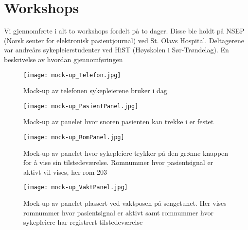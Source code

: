\section{Workshops}
\label{workshops}

Vi gjennomførte i alt to workshops fordelt på to dager. Disse ble holdt på NSEP (Norsk senter for elektronisk pasientjournal) ved St. Olavs Hospital. Deltagerene var andreårs sykepleierstudenter ved HiST (Høyskolen i Sør-Trøndelag). En beskrivelse av hvordan gjennomføringen 

\begin{figure}[H]
\centering
\texttt{[image: mock-up\_Telefon.jpg]}
\caption{Mock-up av telefonen sykepleierene bruker i dag}
\label{mock-up_Telefon}
\end{figure}

\begin{figure}[H]
\centering
\texttt{[image: mock-up\_PasientPanel.jpg]}
\caption{Mock-up av panelet hvor snoren pasienten kan trekke i er festet}
\label{mock-up_PasientPanel}
\end{figure}

\begin{figure}[H]
\centering
\texttt{[image: mock-up\_RomPanel.jpg]}
\caption{Mock-up av panelet hvor sykepleiere trykker på den grønne knappen for å vise sin tilstedeværelse. Romnummer hvor pasientsignal er aktivt vil vises, her rom 203}
\label{mock-up_RomPanel}
\end{figure}

\begin{figure}[H]
\centering
\texttt{[image: mock-up\_VaktPanel.jpg]}
\caption{Mock-up av panelet plassert ved vaktposen på sengetunet. Her vises romnummer hvor pasientsignal er aktivt samt romnummer hvor sykepleiere har registrert tilstedeværelse}
\label{mock-up_VaktPanel}
\end{figure}